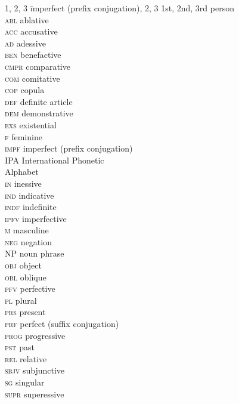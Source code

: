 \documentclass[output=paper]{langsci/langscibook}
\begin{document}
\begin{multicols}{2}
\begin{tabbing}
1, 2, 3 \= imperfect (prefix conjugation), 2, 3 \> 1st, 2nd, 3rd person \\
\textsc{abl} \> ablative \\
\textsc{acc} \> accusative \\
\textsc{ad} \> adessive \\
\textsc{ben} \> benefactive \\
\textsc{cmpr} \> {comparative} \\
\textsc{com} \> comitative \\
\textsc{cop} \> {copula} \\
\textsc{def} \> {definite} {article} \\
\textsc{dem} \> demonstrative \\
\textsc{exs} \> {existential} \\
\textsc{f} \> feminine \\
\textsc{impf} \> imperfect (prefix conjugation) \\
IPA \> International Phonetic \\ \> Alphabet\\
\textsc{in} \> inessive \\
\textsc{ind} \> indicative \\
\textsc{indf} \> indefinite \\
\textsc{ipfv} \> imperfective \\
\textsc{m} \> masculine \\
\textsc{neg} \> {negation} \\
NP \> {noun phrase} \\
\textsc{obj} \> object \\
\textsc{obl} \> oblique \\
\textsc{pfv} \> perfective \\
\textsc{pl} \> plural \\
\textsc{prs} \> present \\
\textsc{prf} \> perfect (suffix conjugation) \\
\textsc{prog} \> progressive \\
\textsc{pst} \> past \\
\textsc{rel} \> {relative} \\
\textsc{sbjv} \> subjunctive \\
\textsc{sg} \> singular \\
\textsc{supr} \> superessive \\
\end{tabbing}
\end{multicols}


{\sloppy\printbibliography[heading=subbibliography,notkeyword=this]}
\end{document}
